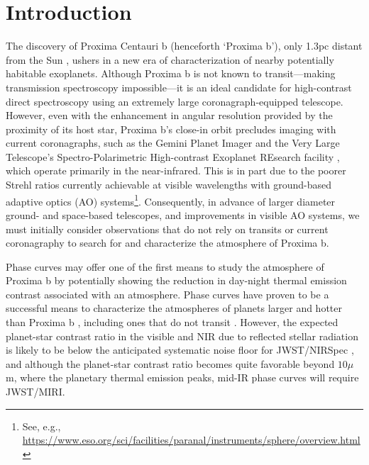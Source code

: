 \documentclass{emulateapj}
\begin{document}


\section{Introduction\label{sec:intro}}

The discovery of Proxima Centauri b (henceforth `Proxima b'), only 1.3pc distant from the Sun \citep{Anglada-Escude2016}, ushers in a new era of characterization of nearby potentially habitable exoplanets. Although Proxima b is not known to transit---making transmission spectroscopy impossible---it is an ideal candidate for high-contrast direct spectroscopy using an extremely large coronagraph-equipped telescope. However, even with the enhancement in angular resolution provided by the proximity of its host star, Proxima b's close-in orbit \citep[$a = 0.0485$ AU;][]{Anglada-Escude2016} precludes imaging with current coronagraphs, such as the Gemini Planet Imager \citep[GPI;][]{Macintosh2014} and the Very Large Telescope's Spectro-Polarimetric High-contrast Exoplanet REsearch facility \citep[VLT-SPHERE;][]{Beuzit2008}, which operate primarily in the near-infrared. This is in part due to the poorer Strehl ratios currently achievable at visible wavelengths with ground-based adaptive optics (AO) systems\footnote{See, e.g., \url{https://www.eso.org/sci/facilities/paranal/instruments/sphere/overview.html}}. Consequently, in advance of larger diameter ground- and space-based telescopes, and improvements in visible AO systems, we must initially consider observations that do not rely on transits or current coronagraphy to search for and characterize the atmosphere of Proxima b.

Phase curves may offer one of the first means to study the atmosphere of Proxima b \citep{Turbet2016,Kreidberg2016,Meadows2016} by potentially showing the reduction in day-night thermal emission contrast associated with an atmosphere. Phase curves have proven to be a successful means to characterize the atmospheres of planets larger and hotter than Proxima b \citep{Cowan2007, Knutson2007, Knutson2008, Crossfield2010, Brogi2012, Zellem2014, Stevenson2014}, including ones that do not transit \citep{Selsis2011, Faigler2011, Maurin2012, Brogi2014}. However, the expected planet-star contrast ratio in the visible and NIR due to reflected stellar radiation is likely to be below the anticipated systematic noise floor for JWST/NIRSpec \citep{Meadows2016}, and although the planet-star contrast ratio becomes quite favorable beyond $10\mu$m, where the planetary thermal emission peaks, mid-IR phase curves will require JWST/MIRI. 
\end{document}
